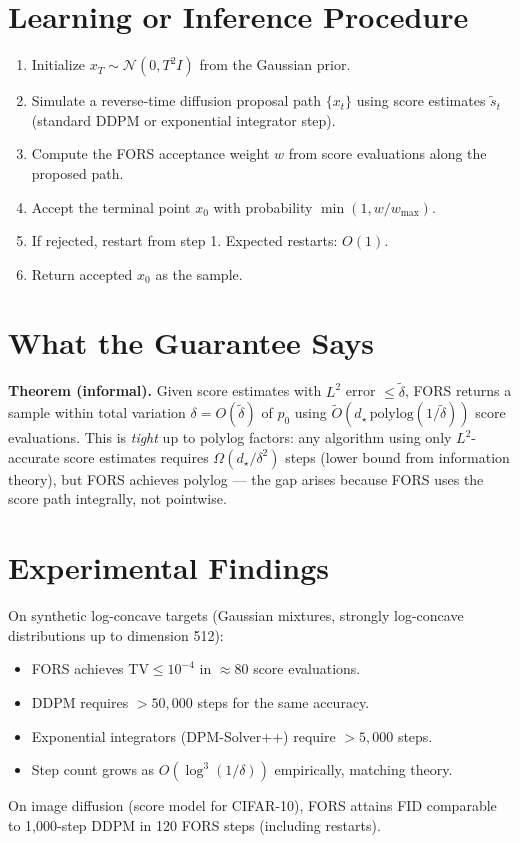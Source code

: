 \documentclass[10pt,twocolumn]{article}
\begin{document}
\section{Learning or Inference Procedure}

\begin{enumerate}[itemsep=2pt,parsep=0pt]
  \item Initialize $x_T \sim \mathcal{N}(0, T^2 I)$ from the Gaussian prior.
  \item Simulate a reverse-time diffusion proposal path $\{x_t\}$ using
    score estimates $\tilde{s}_t$ (standard DDPM or exponential integrator step).
  \item Compute the FORS acceptance weight $w$ from score evaluations along
    the proposed path.
  \item Accept the terminal point $x_0$ with probability $\min(1, w/w_{\max})$.
  \item If rejected, restart from step 1. Expected restarts: $O(1)$.
  \item Return accepted $x_0$ as the sample.
\end{enumerate}

\section{What the Guarantee Says}

\textbf{Theorem (informal).} Given score estimates with $L^2$ error $\leq\tilde{\delta}$,
FORS returns a sample within total variation $\delta = O(\tilde{\delta})$
of $p_0$ using $\widetilde{O}(d_\star\,\mathrm{polylog}(1/\tilde{\delta}))$ score
evaluations. This is \emph{tight} up to polylog factors: any algorithm using
only $L^2$-accurate score estimates requires $\Omega(d_\star / \delta^2)$
steps (lower bound from information theory), but FORS achieves polylog ---
the gap arises because FORS uses the score path integrally, not pointwise.

\section{Experimental Findings}

On synthetic log-concave targets (Gaussian mixtures, strongly log-concave
distributions up to dimension 512):
\begin{itemize}[itemsep=2pt,parsep=0pt]
  \item FORS achieves TV$\leq 10^{-4}$ in $\approx 80$ score evaluations.
  \item DDPM requires $>50{,}000$ steps for the same accuracy.
  \item Exponential integrators (DPM-Solver++) require $>5{,}000$ steps.
  \item Step count grows as $O(\log^3(1/\delta))$ empirically, matching theory.
\end{itemize}
On image diffusion (score model for CIFAR-10), FORS attains FID comparable
to 1{,}000-step DDPM in 120 FORS steps (including restarts).
\end{document}
